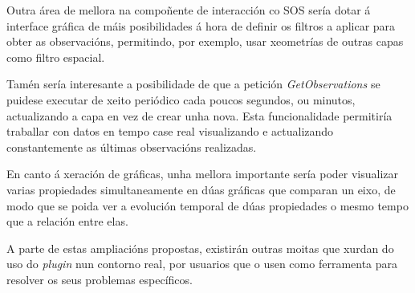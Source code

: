 Outra área de mellora na compoñente de interacción co SOS sería dotar á interface gráfica de máis posibilidades á hora de definir os filtros a aplicar para obter as observacións, permitindo, por exemplo, usar xeometrías de outras capas como filtro espacial.

Tamén sería interesante a posibilidade de que a petición \emph{GetObservations} se puidese executar de xeito periódico cada poucos segundos, ou minutos, actualizando a capa en vez de crear unha nova. Esta funcionalidade permitiría traballar con datos en tempo case real visualizando e actualizando constantemente as últimas observacións realizadas.

En canto á xeración de gráficas, unha mellora importante sería poder visualizar varias propiedades simultaneamente en dúas gráficas que comparan un eixo, de modo que se poida ver a evolución temporal de dúas propiedades o mesmo tempo que a relación entre elas.

A parte de estas ampliacións propostas, existirán outras moitas que xurdan do uso do \emph{plugin} nun contorno real, por usuarios que o usen como ferramenta para resolver os seus problemas específicos.
